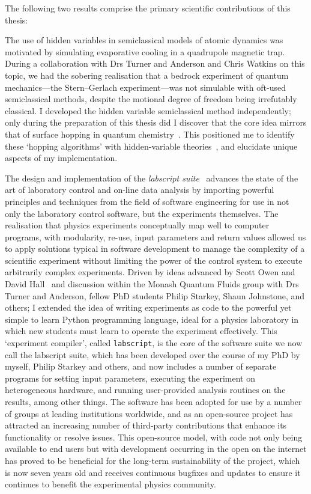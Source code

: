 The following two results comprise the primary scientific contributions of this thesis:

The use of hidden variables in semiclassical models of atomic dynamics was motivated by simulating evaporative cooling in a quadrupole magnetic trap. During a collaboration with Drs Turner and Anderson and Chris Watkins on this topic, we had the sobering realisation that a bedrock experiment of quantum mechanics---the Stern--Gerlach experiment---was not simulable with oft-used semiclassical methods, despite the motional degree of freedom being irrefutably classical. I developed the hidden variable semiclassical method independently; only during the preparation of this thesis did I discover that the core idea mirrors that of surface hopping in quantum chemistry~\cite{doi:10.1063/1.459170}. This positioned me to identify these `hopping algorithms' with hidden-variable theories~\cite{PhysRevA.71.032325}, and elucidate unique aspects of my implementation.

The design and implementation of the \emph{labscript suite}~\cite{starkey_scripted_2013} advances the state of the art of laboratory control and on-line data analysis by importing powerful principles and techniques from the field of software engineering for use in not only the laboratory control software, but the experiments themselves. The realisation that physics experiments conceptually map well to computer programs, with modularity, re-use, input parameters and return values allowed us to apply solutions typical in software development to manage the complexity of a scientific experiment without limiting the power of the control system to execute arbitrarily complex experiments. Driven by ideas advanced by Scott Owen and David Hall~\cite{owen_fast_2003} and discussion within the Monash Quantum Fluids group with Drs Turner and Anderson, fellow PhD students Philip Starkey, Shaun Johnstone, and others; I extended the idea of writing experiments as code to the powerful yet simple to learn Python programming language, ideal for a physics laboratory in which new students must learn to operate the experiment effectively. This `experiment compiler', called \texttt{labscript}, is the core of the software suite we now call the labscript suite, which has been developed over the course of my PhD by myself, Philip Starkey and others, and now includes a number of separate programs for setting input parameters, executing the experiment on heterogeneous hardware, and running user-provided analysis routines on the results, among other things. The software has been adopted for use by a number of groups at leading institutions worldwide, and as an open-source project has attracted an increasing number of third-party contributions that enhance its functionality or resolve issues. This open-source model, with code not only being available to end users but with development occurring in the open on the internet has proved to be beneficial for the long-term sustainability of the project, which is now seven years old and receives continuous bugfixes and updates to ensure it continues to benefit the experimental physics community.

